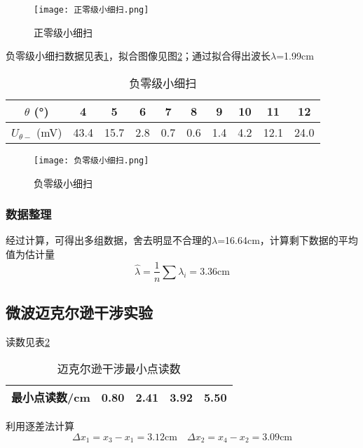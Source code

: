 \documentclass[11pt]{article}
\begin{document}
	\begin{figure}[h!]
		\centering
		\texttt{[image: 正零级小细扫.png]}
		\caption{正零级小细扫}
		\label{fig:正零级小细扫}
	\end{figure}
	
	负零级小细扫数据见表\ref{tab:负零级小细扫}，拟合图像见图\ref{fig:负零级小细扫}；通过拟合得出波长$\lambda$=1.99cm
	
	\begin{table}[h!]
		\centering
		\begin{tabular}{|c|c|c|c|c|c|c|c|c|c|}
			\hline
			$\theta$ (°) & 4 & 5 & 6 & 7 & 8 & 9 & 10 & 11 & 12 \\ \hline
			$U_{\theta-}$ (mV) & 43.4 & 15.7 & 2.8 & 0.7 & 0.6 & 1.4 & 4.2 & 12.1 & 24.0 \\ \hline
		\end{tabular}
		\caption{负零级小细扫}
		\label{tab:负零级小细扫}
	\end{table}
	
	\begin{figure}[h!]
		\centering
		\texttt{[image: 负零级小细扫.png]}
		\caption{负零级小细扫}
		\label{fig:负零级小细扫}
	\end{figure}
	
	\subsubsection{数据整理}
	
	经过计算，可得出多组数据，舍去明显不合理的$\lambda$=16.64cm，计算剩下数据的平均值为估计量\[\hat{\lambda}=\frac{1}{n}\sum \lambda_i=3.36\mathrm{cm}\]
	
	
	
	\subsection{微波迈克尔逊干涉实验}
	
	读数见表\ref{tab: Michelson}
	
	\begin{table}[h!]
		\centering
		\begin{tabular}{|c|l|l|l|l|}
			\hline
			最小点读数/cm & 0.80 & 2.41 & 3.92 & 5.50 \\ \hline
		\end{tabular}
		\caption{迈克尔逊干涉最小点读数}
		\label{tab: Michelson}
	\end{table}
	
	利用逐差法计算\[\Delta x_1=x_3-x_1=3.12\mathrm{cm} \quad \Delta x_2=x_4-x_2=3.09\mathrm{cm}\]
	
\end{document}
